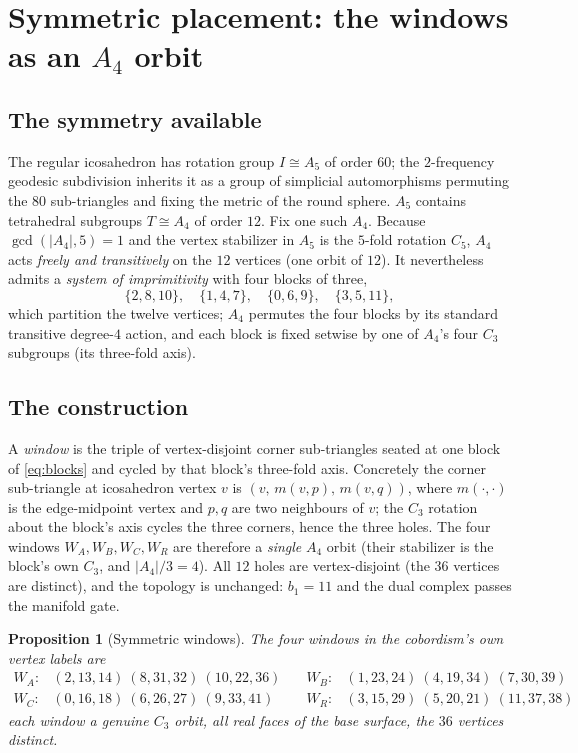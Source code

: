 \documentclass[11pt]{article}
\newtheorem{proposition}{Proposition}
\theoremstyle{definition}
\newcommand{\abs}[1]{\left\lvert #1 \right\rvert}
\newcommand{\winA}{W_{\!A}}
\newcommand{\winB}{W_{\!B}}
\newcommand{\winC}{W_{\!C}}
\newcommand{\winR}{W_{\!R}}
\begin{document}
\section{Symmetric placement: the windows as an \texorpdfstring{$A_4$}{A4} orbit}
\label{sec:placement}

\subsection{The symmetry available}
The regular icosahedron has rotation group $I\cong A_5$ of order $60$; the
$2$-frequency geodesic subdivision inherits it as a group of simplicial
automorphisms permuting the $80$ sub-triangles and fixing the metric of the round
sphere. $A_5$ contains tetrahedral subgroups $T\cong A_4$ of order $12$. Fix one such
$A_4$. Because $\gcd(\abs{A_4},5)=1$ and the vertex stabilizer in $A_5$ is the
$5$-fold rotation $C_5$, $A_4$ acts \emph{freely and transitively} on the $12$
vertices (one orbit of $12$). It nevertheless admits a \emph{system of imprimitivity}
with four blocks of three,
\begin{equation}
  \{2,8,10\},\quad \{1,4,7\},\quad \{0,6,9\},\quad \{3,5,11\},
  \label{eq:blocks}
\end{equation}
which partition the twelve vertices; $A_4$ permutes the four blocks by its standard
transitive degree-$4$ action, and each block is fixed setwise by one of $A_4$'s four
$C_3$ subgroups (its three-fold axis).

\subsection{The construction}
A \emph{window} is the triple of vertex-disjoint corner sub-triangles seated at one
block of \eqref{eq:blocks} and cycled by that block's three-fold axis. Concretely the
corner sub-triangle at icosahedron vertex $v$ is $(v,\,m(v,p),\,m(v,q))$, where
$m(\cdot,\cdot)$ is the edge-midpoint vertex and $p,q$ are two neighbours of $v$; the
$C_3$ rotation about the block's axis cycles the three corners, hence the three holes.
The four windows $\winA,\winB,\winC,\winR$ are therefore a \emph{single} $A_4$ orbit
(their stabilizer is the block's own $C_3$, and $\abs{A_4}/3 = 4$). All $12$ holes are
vertex-disjoint (the $36$ vertices are distinct), and the topology is unchanged:
$b_1=11$ and the dual complex passes the manifold gate.

\begin{proposition}[Symmetric windows]
\label{prop:windows}
The four windows in the cobordism's own vertex labels are
\[
\begin{array}{llll}
\winA: & (2,13,14)\ (8,31,32)\ (10,22,36) &\quad \winB: & (1,23,24)\ (4,19,34)\ (7,30,39)\\[2pt]
\winC: & (0,16,18)\ (6,26,27)\ (9,33,41) &\quad \winR: & (3,15,29)\ (5,20,21)\ (11,37,38)
\end{array}
\]
each window a genuine $C_3$ orbit, all real faces of the base surface, the $36$
vertices distinct.
\end{proposition}
\end{document}

